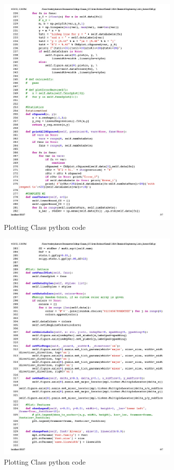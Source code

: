 \documentclass{article}
\begin{document}
\begin{figure}[H] \centering
\includegraphics[width=0.8\textwidth]{code/che_py1024_5.jpg}
\caption{\label{fig1}Plotting Class python code}\end{figure}

\begin{figure}[H] \centering
\includegraphics[width=0.8\textwidth]{code/che_py1024_6.jpg}
\caption{\label{fig1}Plotting Class python code}\end{figure}
\end{document}
